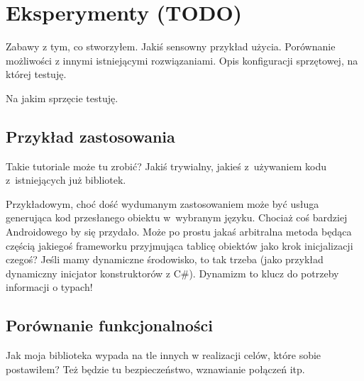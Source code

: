 \chapter{Eksperymenty (TODO)}
Zabawy z tym, co stworzyłem. Jakiś sensowny przykład użycia. Porównanie możliwości z innymi istniejącymi rozwiązaniami. Opis konfiguracji sprzętowej, na której testuję.

%
%
%


Na jakim sprzęcie testuję.

\section{Przykład zastosowania}
Takie tutoriale może tu zrobić? Jakiś trywialny, jakieś z~używaniem kodu z~istniejących już bibliotek.

Przykładowym, choć dość wydumanym zastosowaniem może być usługa generująca kod przesłanego obiektu w~wybranym języku. Chociaż coś bardziej Androidowego by się przydało.
Może po prostu jakaś arbitralna metoda będąca częścią jakiegoś frameworku przyjmująca tablicę obiektów jako krok inicjalizacji czegoś? Jeśli mamy dynamiczne środowisko, to tak trzeba (jako przykład dynamiczny inicjator konstruktorów z C\#). Dynamizm to klucz do potrzeby informacji o typach!

\section{Porównanie funkcjonalności}
Jak moja biblioteka wypada na tle innych w realizacji celów, które sobie postawiłem? Też będzie tu bezpieczeństwo, wznawianie połączeń itp.


